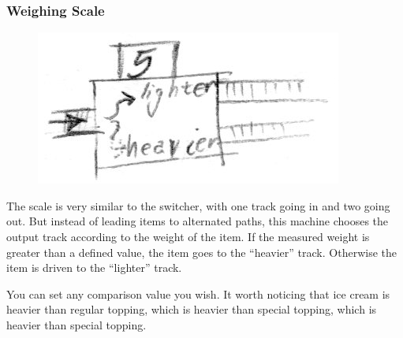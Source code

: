 \documentclass[a4paper]{scrartcl}
\begin{document}
        \subsubsection{Weighing Scale}
            \begin{minipage}[t][8em][t]{\textwidth}
                \begin{figure}
                    \vspace{-20pt}
                    \includegraphics[scale=1]{devices/scale}
                    \vspace{-20pt}
                \end{figure}

                The scale is very similar to the switcher, with one track going
                in and two going out. But instead of leading items to alternated
                paths, this machine chooses the output track according to the
                weight of the item. If the measured weight is greater than a
                defined value, the item goes to the ``heavier'' track. Otherwise
                the item is driven to the ``lighter'' track.

                You can set any comparison value you wish. It worth noticing
                that ice cream is heavier than regular topping, which is heavier
                than special topping, which is heavier than special topping.
            \end{minipage}
\end{document}
